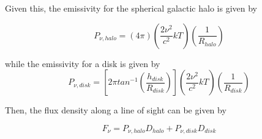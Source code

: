 \documentclass[letterpaper, 10pt]{article}
\begin{document}
Given this, the emissivity for the spherical galactic halo is given by 

\[P_{\nu, halo} = (4\pi)\left(\frac{2\nu^{2}}{c^{2}}kT\right)\left(\frac{1}{R_{halo}}\right)\]

while the emissivity for a disk is given by 
\[P_{\nu, disk} = \left[ 2\pi tan^{-1}\left(\frac{h_{disk}}{R_{disk}}\right) \right]\left(\frac{2\nu^{2}}{c^{2}}kT\right)\left(\frac{1}{R_{disk}}\right)\]

Then, the flux density along a line of sight can be given by 

\[F_{\nu} = P_{\nu, halo}D_{halo} + P_{\nu, disk}D_{disk} \]
\end{document}
